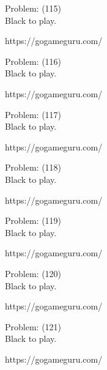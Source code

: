 \documentclass[11pt]{article}
\begin{document}
\begin{minipage}[t]{0.5\textwidth}
  {\centering
  
Problem: (115)\\
Black to play.

https://gogameguru.com/\\
  }
\end{minipage}
\begin{minipage}[t]{0.5\textwidth}
  {\centering
  
Problem: (116)\\
Black to play.

https://gogameguru.com/\\
  }
\end{minipage}
\begin{minipage}[t]{0.5\textwidth}
  {\centering
  
Problem: (117)\\
Black to play.

https://gogameguru.com/\\
  }
\end{minipage}
\begin{minipage}[t]{0.5\textwidth}
  {\centering
  
Problem: (118)\\
Black to play.

https://gogameguru.com/\\
  }
\end{minipage}
\begin{minipage}[t]{0.5\textwidth}
  {\centering
  
Problem: (119)\\
Black to play.

https://gogameguru.com/\\
  }
\end{minipage}
\begin{minipage}[t]{0.5\textwidth}
  {\centering
  
Problem: (120)\\
Black to play.

https://gogameguru.com/\\
  }
\end{minipage}
\begin{minipage}[t]{0.5\textwidth}
  {\centering
  
Problem: (121)\\
Black to play.

https://gogameguru.com/\\
  }
\end{minipage}
\end{document}
